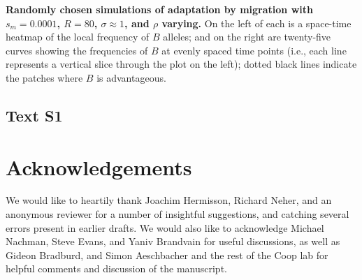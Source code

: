 \documentclass[10pt,letterpaper]{article}
\begin{document}
\textbf{Randomly chosen simulations of adaptation by migration
with $s_m=0.0001$, $R=80$, $\sigma\approx 1$, and $\rho$ varying.}
    On the left of each is a space-time heatmap of the local frequency of $B$ alleles;
    and on the right are twenty-five curves showing the frequencies of $B$ at evenly spaced time points
    (i.e., each line represents a vertical slice through the plot on the left);
    dotted black lines indicate the patches where $B$ is advantageous.

\subsection*{Text S1}

\section*{Acknowledgements}
We would like to heartily thank Joachim Hermisson, Richard Neher, and an anonymous reviewer
for a number of insightful suggestions,
and catching several errors present in earlier drafts. 
We would also like to acknowledge Michael Nachman, Steve Evans, and Yaniv Brandvain for useful discussions, 
as well as Gideon Bradburd, and Simon Aeschbacher and the rest of the Coop lab
for helpful comments and discussion of the manuscript.

\nolinenumbers
\end{document}
